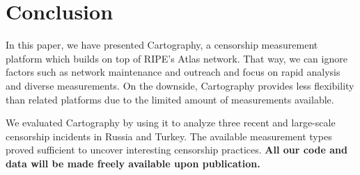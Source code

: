 \section{Conclusion}
\label{sec:conclusion}

In this paper, we have presented \textsf{Cartography}, a censorship measurement
platform which builds on top of RIPE's Atlas network.  That way, we can ignore
factors such as network maintenance and outreach and focus on rapid analysis
and diverse measurements.  On the downside, \textsf{Cartography} provides less
flexibility than related platforms due to the limited amount of measurements
available.

We evaluated \textsf{Cartography} by using it to analyze three recent and
large-scale censorship incidents in Russia and Turkey.  The available
measurement types proved sufficient to uncover interesting censorship
practices.  \textbf{All our code and data will be made freely available upon
publication.}


